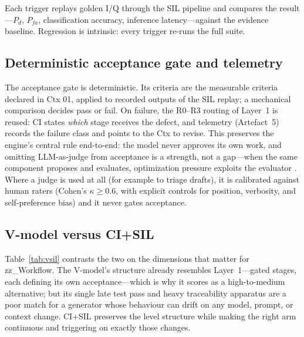 \documentclass[11pt,a4paper]{article}
\begin{document}
Each trigger replays golden I/Q through the SIL pipeline and compares the result---$P_d$,
$P_{fa}$, classification accuracy, inference latency---against the evidence baseline. Regression
is intrinsic: every trigger re-runs the full suite.

\subsection{Deterministic acceptance gate and telemetry}
\label{sec:gate}

The acceptance gate is deterministic. Its criteria are the measurable criteria declared in Ctx
01, applied to recorded outputs of the SIL replay; a mechanical comparison decides pass or fail.
On failure, the R0--R3 routing of Layer~1 is reused: CI states \emph{which} stage receives the
defect, and telemetry (Artefact~5) records the failure class and points to the Ctx to revise.
This preserves the engine's central rule end-to-end: the model never approves its own work, and
omitting LLM-as-judge from acceptance is a strength, not a gap---when the same component proposes
and evaluates, optimization pressure exploits the evaluator \cite{judge2026}. Where a judge is
used at all (for example to triage drafts), it is calibrated against human raters (Cohen's
$\kappa \geq 0.6$, with explicit controls for position, verbosity, and self-preference bias)
\cite{futureagi2026,judge2026} and it never gates acceptance.

\subsection{V-model versus CI+SIL}
\label{sec:contrast}

Table~\ref{tab:vsil} contrasts the two on the dimensions that matter for zz\_Workflow. The
V-model's structure already resembles Layer~1---gated stages, each defining its own
acceptance---which is why it scores as a high-to-medium alternative; but its single late test
pass and heavy traceability apparatus are a poor match for a generator whose behaviour can drift
on any model, prompt, or context change. CI+SIL preserves the level structure while making the
right arm continuous and triggering on exactly those changes.
\end{document}
